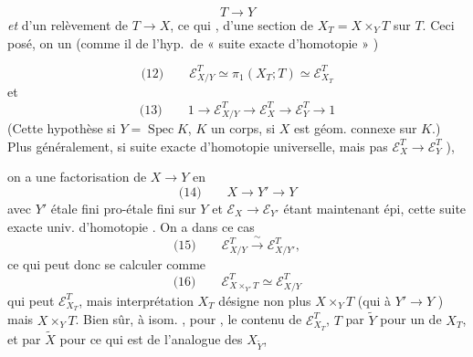 \documentclass[11pt,a4paper]{article}
\begin{document}
\[ T \longrightarrow Y \]
\emph{et} d'un relèvement de $T \to X$, ce qui , d'une section
de $X_T = X \times_Y T$ sur $T$. Ceci posé,
on  un 
(comme il  de l'hyp.\ de « suite exacte d'homotopie » )


\[
\text{(12)} \qquad \mathcal{E}^{T}_{X/Y} \simeq \pi_1(X_T ; T) \simeq \mathcal{E}^{T}_{X_T}
\]
et 
\[
\text{(13)} \qquad 1 \longrightarrow \mathcal{E}^{T}_{X/Y} \longrightarrow \mathcal{E}^{T}_{X} \longrightarrow \mathcal{E}^{T}_{Y} \longrightarrow 1
\]
(Cette hypothèse  si $Y = \operatorname{Spec} K$, $K$ un corps,
si $X$ est géom. connexe sur $K$.)
Plus généralement, si  suite exacte d'homotopie universelle,
mais pas  \ill{} $\mathcal{E}^{T}_{X} \to \mathcal{E}^{T}_{Y}$ ),

on a une factorisation  de $X \to Y$ en
\[
\text{(14)} \qquad X \longrightarrow Y' \longrightarrow Y
\]
avec $Y'$ étale fini  pro-étale fini sur $Y$
et $\mathcal{E}_X \to \mathcal{E}_{Y'}$ étant maintenant épi,
 cette suite exacte univ. d'homotopie . On a \ill{} dans ce cas
\[
\text{(15)} \qquad \mathcal{E}^{T}_{X/Y} \xrightarrow{\ \sim\ } \mathcal{E}^{T}_{X/Y'} ,
\]
ce qui peut donc se calculer comme
\[
\text{(16)} \qquad \mathcal{E}^{T}_{X \times_{Y'} T} \simeq \mathcal{E}^{T}_{X/Y}
\]
qui peut  \ill{} $\mathcal{E}^{T}_{X_T}$, mais 
\struck{\ill{}} interprétation \ill{} \ill{} $X_T$ désigne non plus $X \times_Y T$ (qui
\ill{} à $Y' \to Y$  \ill{}) mais $X \times_Y T$.
Bien sûr, à isom. , \ill{} pour \ill{} \struck{\ill{}} , \ill{}
le contenu de $\mathcal{E}^{T}_{X_T}$,
$T$ par $\tilde{Y}$ pour un  \ill{} de $X_T$, et par
$\tilde{X}$ pour ce qui est de l'analogue des $X_{\tilde{Y}}$,
\end{document}
